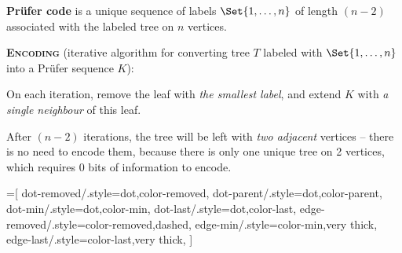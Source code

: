 \documentclass[a4paper,10pt]{article}
\begin{document}
\begin{terms}
    \item \textbf{Pr\"{u}fer code} is a unique sequence of labels $\Set{1,\dotsc,n}$ of length $(n-2)$ associated with the labeled tree on $n$ vertices.
    \begin{terms}
        \item \textbf{\textsc{Encoding}} (iterative algorithm for converting tree $T$ labeled with $\Set{1,\dotsc,n}$ into a Pr\"{u}fer sequence $K$):
        \begin{terms}
            \item On each iteration, remove the leaf with \textcolor{color-min}{\emph{the smallest label}}, and extend $K$ with \textcolor{color-parent}{\emph{a single neighbour}} of this leaf.
            \item After $(n-2)$ iterations, the tree will be left with \textcolor{color-last}{\emph{two adjacent}} vertices \--- there is no need to encode them, because there is only one unique tree on 2 vertices, which requires 0 bits of information to encode.
        \end{terms}

        \begingroup

        \def\Dist{.5}
        \def\LabelY{-0.9}

        =[
            dot-removed/.style={dot,color-removed},
            dot-parent/.style={dot,color-parent},
            dot-min/.style={dot,color-min},
            dot-last/.style={dot,color-last},
            edge-removed/.style={color-removed,dashed},
            edge-min/.style={color-min,very thick},
            edge-last/.style={color-last,very thick},
        ]


\end{terms}
\end{terms}
\end{document}
